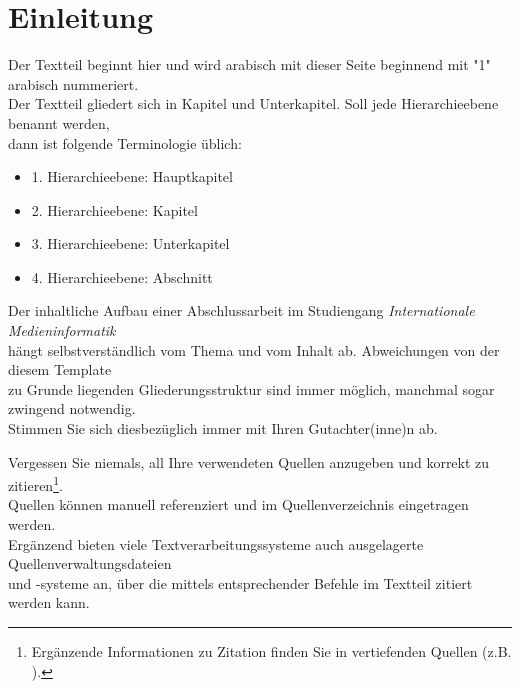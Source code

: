 \documentclass[oneside,bibliography=totocnumbered,BCOR=5mm]{scrbook}
\begin{document}
\mainmatter

\chapter{Einleitung}
\label{ch:einleitung}


\vspace{1cm}
Der Textteil beginnt hier und wird arabisch mit dieser Seite beginnend mit "1" arabisch nummeriert. \\
Der Textteil gliedert sich in Kapitel und Unterkapitel. Soll jede Hierarchieebene benannt werden, \\
dann ist folgende Terminologie üblich:

\begin{itemize}
\item 1. Hierarchieebene: Hauptkapitel
\item 2. Hierarchieebene: Kapitel
\item 3. Hierarchieebene: Unterkapitel
\item 4. Hierarchieebene: Abschnitt
\end{itemize}

Der inhaltliche Aufbau einer Abschlussarbeit im Studiengang \textit{Internationale Medieninformatik} \\
hängt selbstverständlich vom Thema und vom Inhalt ab. Abweichungen von der diesem Template \\
zu Grunde liegenden Gliederungsstruktur sind immer möglich, manchmal sogar zwingend notwendig. \\
Stimmen Sie sich diesbezüglich immer mit Ihren Gutachter(inne)n ab.

Vergessen Sie niemals, all Ihre verwendeten Quellen anzugeben und korrekt zu zitieren\footnote{Ergänzende Informationen zu Zitation finden Sie in vertiefenden Quellen (z.B. \cite{balzert2011}).}. \\
Quellen können manuell referenziert und im Quellenverzeichnis eingetragen werden. \\
Ergänzend bieten viele Textverarbeitungssysteme auch ausgelagerte Quellenverwaltungsdateien \\
und -systeme an, über die mittels entsprechender Befehle im Textteil zitiert werden kann.
\end{document}
